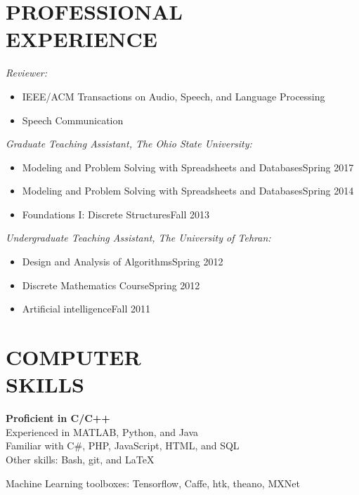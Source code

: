 \documentclass[margin, 10pt]{res}
\begin{document}
\begin{resume}
\section{PROFESSIONAL \\ EXPERIENCE}
\textit{Reviewer:}
\begin{itemize}
\item IEEE/ACM Transactions on Audio, Speech, and Language Processing
\item Speech Communication
\end{itemize}

\textit{Graduate Teaching Assistant, The Ohio State University:}
\begin{itemize}
\item Modeling and Problem Solving with Spreadsheets and Databases\hfill Spring 2017
\item Modeling and Problem Solving with Spreadsheets and Databases\hfill Spring 2014 
\item Foundations I: Discrete Structures\hfill Fall 2013
\end{itemize}
\textit{Undergraduate Teaching Assistant, The University of Tehran:}
\begin{itemize}
\item Design and Analysis of Algorithms\hfill Spring 2012 
\item Discrete Mathematics Course\hfill Spring 2012
\item Artificial intelligence\hfill Fall 2011
\end{itemize}


\section{COMPUTER \\ SKILLS}
\textbf{Proficient in C/C++}\\
Experienced in MATLAB, Python, and Java\\
Familiar with C\#, PHP, JavaScript, HTML, and SQL\\ 
Other skills: Bash, git, and \LaTeX

Machine Learning toolboxes: Tensorflow,
Caffe, htk, theano, MXNet


\end{resume}
\end{document}

